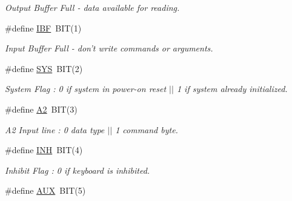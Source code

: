 \begin{DoxyCompactItemize}
\begin{DoxyCompactList}\small\item\em Output Buffer Full -\/ data available for reading. \end{DoxyCompactList}\item 
\hypertarget{group__i8042_ga3c48b10907056351582baf9f6478598e}{\#define \hyperlink{group__i8042_ga3c48b10907056351582baf9f6478598e}{I\-B\-F}~B\-I\-T(1)}\label{group__i8042_ga3c48b10907056351582baf9f6478598e}

\begin{DoxyCompactList}\small\item\em Input Buffer Full -\/ don't write commands or arguments. \end{DoxyCompactList}\item 
\hypertarget{group__i8042_gae3d9f52a1a315303ad04f0576bd42a25}{\#define \hyperlink{group__i8042_gae3d9f52a1a315303ad04f0576bd42a25}{S\-Y\-S}~B\-I\-T(2)}\label{group__i8042_gae3d9f52a1a315303ad04f0576bd42a25}

\begin{DoxyCompactList}\small\item\em System Flag \-: 0 if system in power-\/on reset $|$$|$ 1 if system already initialized. \end{DoxyCompactList}\item 
\hypertarget{group__i8042_ga2946bc30423c2a996eeafa49e995c30e}{\#define \hyperlink{group__i8042_ga2946bc30423c2a996eeafa49e995c30e}{A2}~B\-I\-T(3)}\label{group__i8042_ga2946bc30423c2a996eeafa49e995c30e}

\begin{DoxyCompactList}\small\item\em A2 Input line \-: 0 data type $|$$|$ 1 command byte. \end{DoxyCompactList}\item 
\hypertarget{group__i8042_ga03f542f1e0e2ba512c4ed189decfee3d}{\#define \hyperlink{group__i8042_ga03f542f1e0e2ba512c4ed189decfee3d}{I\-N\-H}~B\-I\-T(4)}\label{group__i8042_ga03f542f1e0e2ba512c4ed189decfee3d}

\begin{DoxyCompactList}\small\item\em Inhibit Flag \-: 0 if keyboard is inhibited. \end{DoxyCompactList}\item 
\hypertarget{group__i8042_ga1b41fd2be63532d4ab910f8b256c3811}{\#define \hyperlink{group__i8042_ga1b41fd2be63532d4ab910f8b256c3811}{A\-U\-X}~B\-I\-T(5)}\label{group__i8042_ga1b41fd2be63532d4ab910f8b256c3811}


\end{DoxyCompactItemize}
